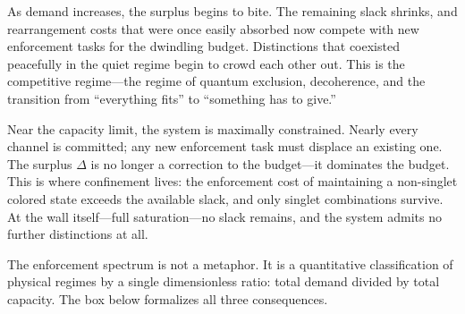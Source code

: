 \documentclass[11pt]{article}
\begin{document}
As demand increases, the surplus begins to bite.  The remaining slack shrinks, and rearrangement costs that were once easily absorbed now compete with new enforcement tasks for the dwindling budget.  Distinctions that coexisted peacefully in the quiet regime begin to crowd each other out.  This is the competitive regime---the regime of quantum exclusion, decoherence, and the transition from ``everything fits'' to ``something has to give.''

Near the capacity limit, the system is maximally constrained.  Nearly every channel is committed; any new enforcement task must displace an existing one.  The surplus $\Delta$ is no longer a correction to the budget---it dominates the budget.  This is where confinement lives: the enforcement cost of maintaining a non-singlet colored state exceeds the available slack, and only singlet combinations survive.  At the wall itself---full saturation---no slack remains, and the system admits no further distinctions at all.

The enforcement spectrum is not a metaphor.  It is a quantitative classification of physical regimes by a single dimensionless ratio: total demand divided by total capacity.  The box below formalizes all three consequences.
\end{document}
